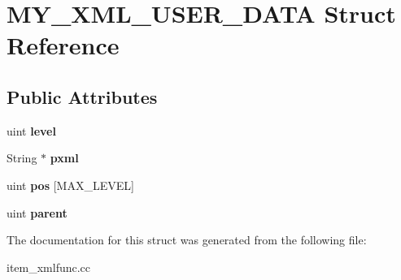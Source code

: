 \hypertarget{structMY__XML__USER__DATA}{}\section{M\+Y\+\_\+\+X\+M\+L\+\_\+\+U\+S\+E\+R\+\_\+\+D\+A\+TA Struct Reference}
\label{structMY__XML__USER__DATA}
\subsection*{Public Attributes}
\begin{DoxyCompactItemize}
\item 
\mbox{\label{structMY__XML__USER__DATA_a0fe6f18498c23dea4a0a9160417012a2}} 
uint {\bfseries level}
\item 
\mbox{\label{structMY__XML__USER__DATA_af547d94859fde4eae83e1c0ab9751190}} 
String $\ast$ {\bfseries pxml}
\item 
\mbox{\label{structMY__XML__USER__DATA_a470739ac6caf630f2d049a9cbe7303a5}} 
uint {\bfseries pos} \mbox{[}M\+A\+X\+\_\+\+L\+E\+V\+EL\mbox{]}
\item 
\mbox{\label{structMY__XML__USER__DATA_a9944d8185327ab80f10f91898f77f6dd}} 
uint {\bfseries parent}
\end{DoxyCompactItemize}


The documentation for this struct was generated from the following file\+:\begin{DoxyCompactItemize}
\item 
item\+\_\+xmlfunc.\+cc\end{DoxyCompactItemize}
